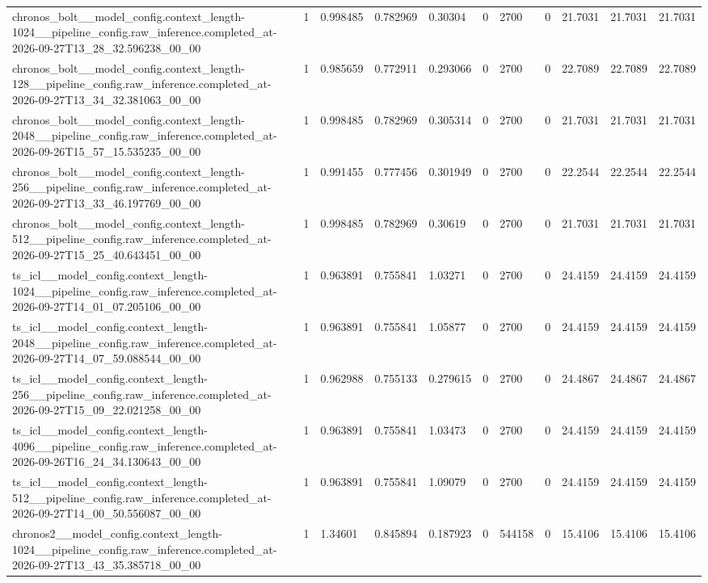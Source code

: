 \begin{tabular}{lllllllllll}
chronos\_bolt\_\_model\_config.context\_length-1024\_\_pipeline\_config.raw\_inference.completed\_at-2026-09-27T13\_28\_32.596238\_00\_00 & 1 & 0.998485 & 0.782969 & 0.30304 & 0 & 2700 & 0 & 21.7031 & 21.7031 & 21.7031 \\
chronos\_bolt\_\_model\_config.context\_length-128\_\_pipeline\_config.raw\_inference.completed\_at-2026-09-27T13\_34\_32.381063\_00\_00 & 1 & 0.985659 & 0.772911 & 0.293066 & 0 & 2700 & 0 & 22.7089 & 22.7089 & 22.7089 \\
chronos\_bolt\_\_model\_config.context\_length-2048\_\_pipeline\_config.raw\_inference.completed\_at-2026-09-26T15\_57\_15.535235\_00\_00 & 1 & 0.998485 & 0.782969 & 0.305314 & 0 & 2700 & 0 & 21.7031 & 21.7031 & 21.7031 \\
chronos\_bolt\_\_model\_config.context\_length-256\_\_pipeline\_config.raw\_inference.completed\_at-2026-09-27T13\_33\_46.197769\_00\_00 & 1 & 0.991455 & 0.777456 & 0.301949 & 0 & 2700 & 0 & 22.2544 & 22.2544 & 22.2544 \\
chronos\_bolt\_\_model\_config.context\_length-512\_\_pipeline\_config.raw\_inference.completed\_at-2026-09-27T15\_25\_40.643451\_00\_00 & 1 & 0.998485 & 0.782969 & 0.30619 & 0 & 2700 & 0 & 21.7031 & 21.7031 & 21.7031 \\
ts\_icl\_\_model\_config.context\_length-1024\_\_pipeline\_config.raw\_inference.completed\_at-2026-09-27T14\_01\_07.205106\_00\_00 & 1 & 0.963891 & 0.755841 & 1.03271 & 0 & 2700 & 0 & 24.4159 & 24.4159 & 24.4159 \\
ts\_icl\_\_model\_config.context\_length-2048\_\_pipeline\_config.raw\_inference.completed\_at-2026-09-27T14\_07\_59.088544\_00\_00 & 1 & 0.963891 & 0.755841 & 1.05877 & 0 & 2700 & 0 & 24.4159 & 24.4159 & 24.4159 \\
ts\_icl\_\_model\_config.context\_length-256\_\_pipeline\_config.raw\_inference.completed\_at-2026-09-27T15\_09\_22.021258\_00\_00 & 1 & 0.962988 & 0.755133 & 0.279615 & 0 & 2700 & 0 & 24.4867 & 24.4867 & 24.4867 \\
ts\_icl\_\_model\_config.context\_length-4096\_\_pipeline\_config.raw\_inference.completed\_at-2026-09-26T16\_24\_34.130643\_00\_00 & 1 & 0.963891 & 0.755841 & 1.03473 & 0 & 2700 & 0 & 24.4159 & 24.4159 & 24.4159 \\
ts\_icl\_\_model\_config.context\_length-512\_\_pipeline\_config.raw\_inference.completed\_at-2026-09-27T14\_00\_50.556087\_00\_00 & 1 & 0.963891 & 0.755841 & 1.09079 & 0 & 2700 & 0 & 24.4159 & 24.4159 & 24.4159 \\
chronos2\_\_model\_config.context\_length-1024\_\_pipeline\_config.raw\_inference.completed\_at-2026-09-27T13\_43\_35.385718\_00\_00 & 1 & 1.34601 & 0.845894 & 0.187923 & 0 & 544158 & 0 & 15.4106 & 15.4106 & 15.4106 \\

\end{tabular}
